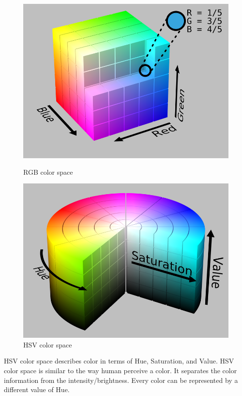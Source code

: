 \begin{figure}[htbp]
\begin{minipage}[t]{0.45\linewidth}
    \includegraphics[width=\linewidth]{images/RGB.png}
    \caption{RGB color space}
    \label{f:rgb}
\end{minipage}
    \hfill
\begin{minipage}[t]{0.45\linewidth}
    \includegraphics[width=\linewidth]{images/HSV.png}
    \caption{HSV color space}
    \label{f:hsv}
\end{minipage} 
\end{figure}

HSV color space describes color in terms of Hue, Saturation, and Value.
HSV color space is similar to the way human perceive a color.
It separates the color information from the intensity/brightness.
Every color can be represented by a different value of Hue.

